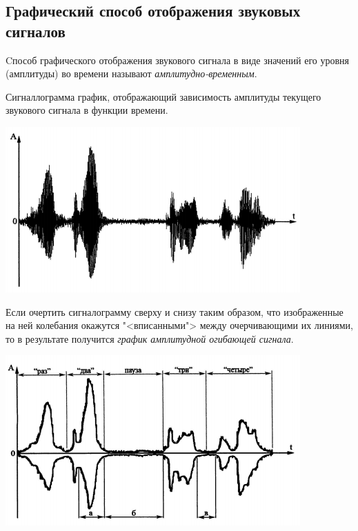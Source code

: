\documentclass{beamer}
\begin{document}
\subsection{Графический способ отображения звуковых сигналов}
\begin{frame}
Cпособ графического отображения звукового сигнала в виде значений его уровня (амплитуды) во времени называют {\itshape амплитудно-временным}.
\begin{block}{Сигналлограмма}
график, отображающий зависимость амплитуды текущего звукового сигнала в функции времени.
\end{block}
\begin{center}
\includegraphics[scale=0.8]{pic-waveform-01}
\end{center}
\end{frame}    

\begin{frame}
Если очертить сигналограмму сверху и снизу таким образом, что изображенные на ней колебания окажутся "<вписанными"> между очерчивающими их линиями, то в результате получится {\itshape график амплитудной огибающей сигнала}.
\begin{center}
\includegraphics[scale=0.8]{pic-waveform-02}
\end{center}
\end{frame}  
\end{document}
